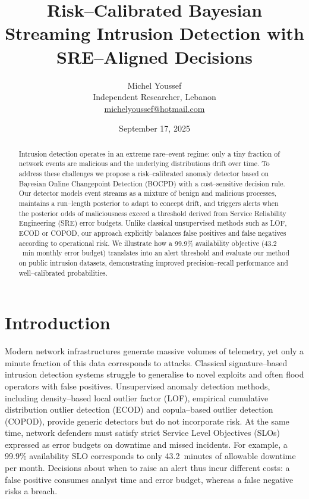 \documentclass{article}
\title{Risk--Calibrated Bayesian Streaming Intrusion Detection with SRE--Aligned Decisions}
\author{Michel Youssef\\Independent Researcher, Lebanon\\\href{mailto:michelyoussef@hotmail.com}{michelyoussef@hotmail.com}}
\date{September 17, 2025}
\begin{document}
\maketitle

\begin{abstract}
Intrusion detection operates in an extreme rare--event regime: only a tiny fraction of network events are malicious and the underlying distributions drift over time.  To address these challenges we propose a risk--calibrated anomaly detector based on Bayesian Online Changepoint Detection (BOCPD) with a cost--sensitive decision rule.  Our detector models event streams as a mixture of benign and malicious processes, maintains a run--length posterior to adapt to concept drift, and triggers alerts when the posterior odds of maliciousness exceed a threshold derived from Service Reliability Engineering (SRE) error budgets.  Unlike classical unsupervised methods such as LOF\cite{breunig2000lof}, ECOD\cite{li2022ecod} or COPOD\cite{li2020copod}, our approach explicitly balances false positives and false negatives according to operational risk.  We illustrate how a 99.9\% availability objective (\(43.2\)~min monthly error budget) translates into an alert threshold and evaluate our method on public intrusion datasets, demonstrating improved precision--recall performance and well--calibrated probabilities.
\end{abstract}

\section{Introduction}
Modern network infrastructures generate massive volumes of telemetry, yet only a minute fraction of this data corresponds to attacks.  Classical signature--based intrusion detection systems struggle to generalise to novel exploits and often flood operators with false positives.  Unsupervised anomaly detection methods, including density--based local outlier factor (LOF)\cite{breunig2000lof}, empirical cumulative distribution outlier detection (ECOD)\cite{li2022ecod} and copula--based outlier detection (COPOD)\cite{li2020copod}, provide generic detectors but do not incorporate risk.  At the same time, network defenders must satisfy strict Service Level Objectives (SLOs) expressed as error budgets on downtime and missed incidents.  For example, a 99.9\% availability SLO corresponds to only 43.2~minutes of allowable downtime per month.  Decisions about when to raise an alert thus incur different costs: a false positive consumes analyst time and error budget, whereas a false negative risks a breach.
\end{document}
